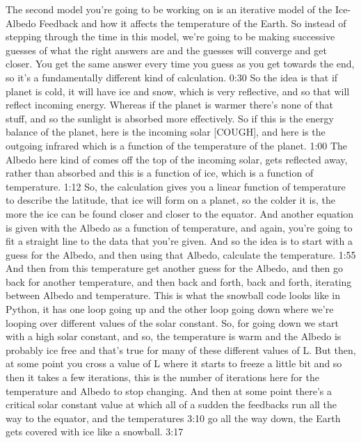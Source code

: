 {The second model you're going to be working on is an iterative model of the Ice-Albedo Feedback and how it affects the temperature of the Earth. So instead of stepping through the time in this model, we're going to be making successive guesses of what the right answers are and the guesses will converge and get closer. You get the same answer every time you guess as you get towards the end, so it's a fundamentally different kind of calculation. 
0:30
So the idea is that if planet is cold, it will have ice and snow, which is very reflective, and so that will reflect incoming energy. Whereas if the planet is warmer there's none of that stuff, and so the sunlight is absorbed more effectively. So if this is the energy balance of the planet, here is the incoming solar [COUGH], and here is the outgoing infrared which is a function of the temperature of the planet. 
1:00
The Albedo here kind of comes off the top of the incoming solar, gets reflected away, rather than absorbed and this is a function of ice, which is a function of temperature. 
1:12
So, the calculation gives you a linear function of temperature to describe the latitude, that ice will form on a planet, so the colder it is, the more the ice can be found closer and closer to the equator. And another equation is given with the Albedo as a function of temperature, and again, you're going to fit a straight line to the data that you're given. And so the idea is to start with a guess for the Albedo, and then using that Albedo, calculate the temperature. 
1:55
And then from this temperature get another guess for the Albedo, and then go back for another temperature, and then back and forth, back and forth, iterating between Albedo and temperature. This is what the snowball code looks like in Python, it has one loop going up and the other loop going down where we're looping over different values of the solar constant. So, for going down we start with a high solar constant, and so, the temperature is warm and the Albedo is probably ice free and that's true for many of these different values of L. But then, at some point you cross a value of L where it starts to freeze a little bit and so then it takes a few iterations, this is the number of iterations here for the temperature and Albedo to stop changing. And then at some point there's a critical solar constant value at which all of a sudden the feedbacks run all the way to the equator, and the temperatures 
3:10
go all the way down, the Earth gets covered with ice like a snowball. 
3:17
}
